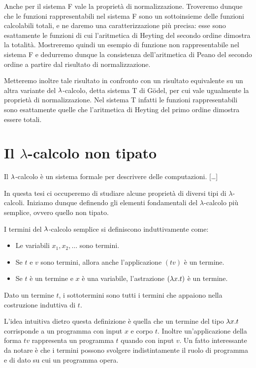\documentclass[]{marticle}
\begin{document}
Anche per il sistema F vale la propriet\`a di normalizzazione. Troveremo dunque
che le funzioni rappresentabili nel sistema F sono un sottoinsieme delle
funzioni calcolabili totali, e ne daremo una caratterizzazione pi\`u precisa:
esse sono esattamente le funzioni di cui l'aritmetica di Heyting del secondo
ordine dimostra la totalit\`a.  Mostreremo quindi un esempio di funzione non
rappresentabile nel sistema F e dedurremo dunque la consistenza dell'aritmetica
di Peano del secondo ordine a partire dal risultato di normalizzazione.

Metteremo inoltre tale risultato in confronto con un risultato equivalente su un
altra variante del $\lambda$-calcolo, detta sistema T di G\"odel, per cui vale
ugualmente la propriet\`a di normalizzazione. Nel sistema T infatti le funzioni
rappresentabili sono esattamente quelle che l'aritmetica di Heyting del primo
ordine dimostra essere totali.

\section{Il $\lambda$-calcolo non tipato}

Il $\lambda$-calcolo \`e un sistema formale per descrivere delle computazioni.
[\dots]

In questa tesi ci occuperemo di studiare alcune propriet\`a di diversi tipi
di $\lambda$-calcoli. Iniziamo dunque definendo gli elementi fondamentali del
$\lambda$-calcolo pi\`u semplice, ovvero quello non tipato.

\begin{block}[Definizione]
    I termini del $\lambda$-calcolo semplice si definiscono induttivamente come:
    \begin{itemize}
        \item Le variabili $x_1, x_2, \dots$ sono termini.
        \item Se $t$ e $v$ sono termini, allora anche l'applicazione $(tv)$ \`e
            un termine.
        \item Se $t$ \`e un termine e $x$ \`e una variabile, l'astrazione $(\lambda
            x.  t)$ \`e un termine.
    \end{itemize}

    Dato un termine $t$, i sottotermini sono tutti i termini che appaiono nella
    costruzione induttiva di $t$.
\end{block}

L'idea intuitiva dietro questa definizione \`e quella che un termine del tipo
$\lambda x.t$ corrisponde a un programma con input $x$ e corpo $t$. Inoltre
un'applicazione della forma $tv$ rappresenta  un programma $t$ quando con input
$v$. Un fatto interessante da notare \`e che i termini possono svolgere
indistintamente il ruolo di programma e di dato su cui un programma opera.
\end{document}
